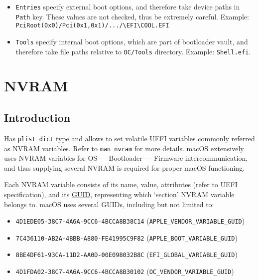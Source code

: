 \documentclass[]{article}
\makeatletter
\providecommand{\tightlist}{%
  \setlength{\itemsep}{0pt}\setlength{\parskip}{0pt}}
\renewcommand{\label}[1]{%
\zref@wrapper@immediate{\oldlabel{#1}}}  %
\makeatother
\begin{document}
\begin{enumerate}
  \begin{itemize}
  \tightlist
  \item \texttt{Entries} specify external boot options, and therefore take device
  paths in \texttt{Path} key. These values are not checked, thus be extremely careful.
  Example: \texttt{PciRoot(0x0)/Pci(0x1,0x1)/.../\textbackslash EFI\textbackslash COOL.EFI}
  \item \texttt{Tools} specify internal boot options, which are part of bootloader
  vault, and therefore take file paths relative to \texttt{OC/Tools} directory.
  Example: \texttt{Shell.efi}.
  \end{itemize}

\end{enumerate}


\section{NVRAM}\label{nvram}

\subsection{Introduction}\label{nvramintro}

Has \texttt{plist\ dict} type and allows to set volatile UEFI variables
commonly referred as NVRAM variables. Refer to \texttt{man\ nvram} for
more details. macOS extensively uses NVRAM variables for OS --- Bootloader
--- Firmware intercommunication, and thus supplying several NVRAM is
required for proper macOS functioning.

Each NVRAM variable consists of its name, value, attributes (refer to
UEFI specification), and its
\href{https://en.wikipedia.org/wiki/Universally_unique_identifier}{GUID},
representing which `section' NVRAM variable belongs to. macOS uses
several GUIDs, including but not limited to:

\begin{itemize}
\tightlist
\item
  \texttt{4D1EDE05-38C7-4A6A-9CC6-4BCCA8B38C14}
  (\texttt{APPLE\_VENDOR\_VARIABLE\_GUID})
\item
  \texttt{7C436110-AB2A-4BBB-A880-FE41995C9F82}
  (\texttt{APPLE\_BOOT\_VARIABLE\_GUID})
\item
  \texttt{8BE4DF61-93CA-11D2-AA0D-00E098032B8C}
  (\texttt{EFI\_GLOBAL\_VARIABLE\_GUID})
\item
  \texttt{4D1FDA02-38C7-4A6A-9CC6-4BCCA8B30102}
  (\texttt{OC\_VENDOR\_VARIABLE\_GUID})
\end{itemize}
\end{document}
